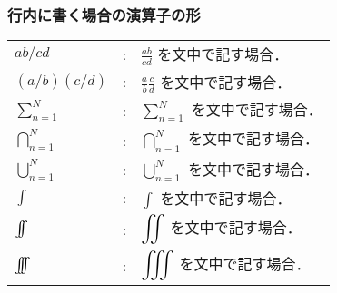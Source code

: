     \subsubsection*{行内に書く場合の演算子の形}
        \begin{tabular}{lll}
            $ab/cd$                 &:  & $\displaystyle \frac{ab}{cd}$ を文中で記す場合．            \\
            $(a/b)(c/d)$            &:  & $\displaystyle \frac{a}{b}\frac{c}{d}$ を文中で記す場合．   \\
            $\sum_{n=1}^{N}$        &:  & $\displaystyle \sum_{n=1}^{N}$ を文中で記す場合．           \\
            $\bigcap_{n=1}^{N}$     &:  & $\displaystyle \bigcap_{n=1}^{N}$ を文中で記す場合．        \\
            $\bigcup_{n=1}^{N}$     &:  & $\displaystyle \bigcup_{n=1}^{N}$ を文中で記す場合．        \\
            $\int$                  &:  & $\displaystyle \int$ を文中で記す場合．                     \\
            $\int\mspace{-11mu}\int$                 &:  & $\displaystyle \int\mspace{-11mu}\int$ を文中で記す場合．                    \\
            $\int\mspace{-11mu}\int\mspace{-11mu}\int$                 &:  & $\displaystyle \int\mspace{-11mu}\int\mspace{-11mu}\int$ を文中で記す場合．                    \\
    \end{tabular}


